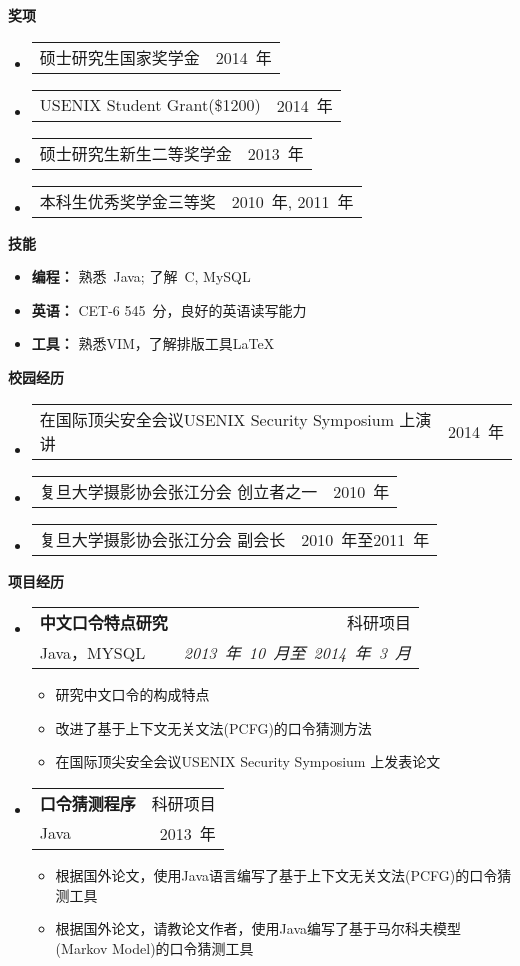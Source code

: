 \documentclass[letterpaper,10pt]{article}
\makeatletter
\newcommand{\resitem}[1]{\item #1 \vspace{-2pt}}
\newcommand{\resheading}[1]{{\large \colorbox{mygrey}{\begin{minipage}{\textwidth}{\textbf{#1 \vphantom{p\^{E}}}}\end{minipage}}}}
\newcommand{\ressubheading}[4]{
\begin{tabular*}{6.5in}{l@{\extracolsep{\fill}}r}
		\textbf{#1} & #2 \\
		#3 & #4 \\
\end{tabular*}\vspace{-6pt}}
\newcommand{\cvitem}[2]{
\begin{tabular*}{6.5in}{l@{\extracolsep{\fill}}r}
		#1 & #2 \\
\end{tabular*}\vspace{-1pt}}
\makeatother
\begin{document}
\resheading{奖项}
	\begin{itemize}
		\item \cvitem{硕士研究生国家奖学金}{2014~年}
		\item \cvitem{USENIX Student Grant(\$1200)}{2014~年}
		\item \cvitem{硕士研究生新生二等奖学金}{2013~年}
		\item \cvitem{本科生优秀奖学金三等奖}{2010~年, 2011~年}
	\end{itemize}


\resheading{{技能}}
	\begin{itemize}
		\item
            \textbf{编程：} 熟悉~Java; 了解~C, MySQL %
        \item
            \textbf{英语：} CET-6 545~分，良好的英语读写能力
        \item 
        	\textbf{工具：} 熟悉VIM，了解排版工具\LaTeX
	\end{itemize} %


\resheading{校园经历}
\begin{itemize}
	\item \cvitem{在国际顶尖安全会议USENIX Security Symposium 上演讲}{2014~年}
	\item \cvitem{复旦大学摄影协会张江分会 创立者之一}{2010~年}
	\item \cvitem{复旦大学摄影协会张江分会 副会长}{2010~年至2011~年}
\end{itemize}

\resheading{项目经历}
	\begin{itemize}
		\item
			\ressubheading{中文口令特点研究}{科研项目}{Java，MYSQL}{\emph{2013~年~10~月至~2014~年~3~月}}
			{\begin{itemize}
				\resitem{研究中文口令的构成特点}
                \resitem{改进了基于上下文无关文法(PCFG)的口令猜测方法}
				\resitem{在国际顶尖安全会议USENIX Security Symposium 上发表论文}
			\end{itemize}
			}	
	\end{itemize}
	\begin{itemize}
		\item 
			\ressubheading{口令猜测程序}{科研项目}{Java}{2013~年}
			{\begin{itemize}
				\resitem{根据国外论文，使用Java语言编写了基于上下文无关文法(PCFG)的口令猜测工具}
				\resitem{根据国外论文，请教论文作者，使用Java编写了基于马尔科夫模型(Markov Model)的口令猜测工具}
			\end{itemize}
			}
	\end{itemize}
			
\end{document}
